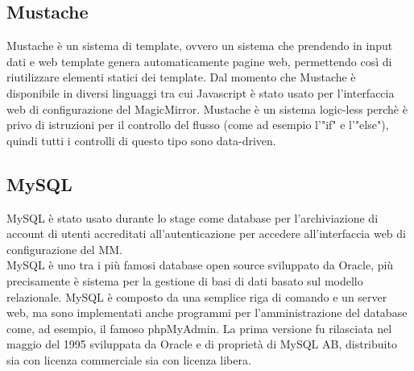 \subsection{Mustache}\label{cap:mustache}
Mustache \`e un sistema di template, ovvero un sistema che prendendo in input dati e web template
genera automaticamente pagine web, permettendo cos\`i di riutilizzare elementi statici dei template.
Dal momento che Mustache \`e disponibile in diversi linguaggi tra cui Javascript \`e stato usato per l'interfaccia web di configurazione
del MagicMirror.
Mustache \`e un sistema logic-less perch\`e \`e privo di istruzioni per il controllo del flusso
(come ad esempio l'"if" e l'"else"), quindi tutti i controlli di questo tipo sono data-driven.\\

\subsection{MySQL}
MySQL \`e stato usato durante lo stage come database per l'archiviazione di account di utenti
accreditati all'autenticazione per accedere all'interfaccia web di configurazione del MM.\\
MySQL \`e uno tra i pi\`u famosi database open source sviluppato da Oracle, pi\`u precisamente
\`e sistema per la gestione di basi di dati basato sul modello relazionale.
MySQL \`e composto da una semplice riga di comando e un server web, ma sono implementati anche programmi
per l'amministrazione del database come, ad esempio, il famoso phpMyAdmin.
La prima versione fu rilasciata nel maggio del 1995 sviluppata da Oracle e di propriet\`a di MySQL AB,
distribuito sia con licenza commerciale sia con licenza libera.

